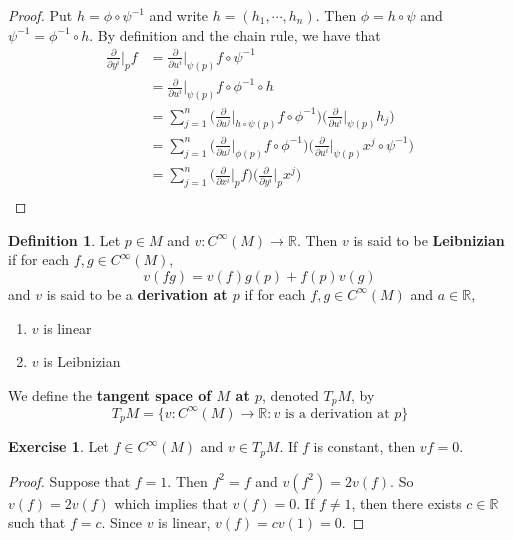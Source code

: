 \documentclass{book}
\theoremstyle{definition}
\newtheorem{defn}[definition]{Definition}
\newtheorem{ex}[definition]{Exercise}
\newcommand{\R}{\mathbb{R}}
\DeclareMathOperator*{\0}{\mbf{0}}
\DeclareMathOperator*{\1}{\mbf{1}}
\newcommand{\tbf}[1]{\textbf{#1}}
\newcommand{\p}{\partial}
\begin{document}
	\begin{proof}
		Put $h = \phi \circ \psi^{-1}$ and write $h = (h_1, \cdots, h_n)$. Then $\phi = h \circ \psi$ and $\psi^{-1} = \phi^{-1} \circ h$. By definition and the chain rule, we have that 
		\begin{align*}
		\frac{\p}{\p y^i} \bigg|_p f 
			&= \frac{\p}{\p u^i} \bigg|_{\psi(p)} f \circ \psi^{-1} \\
			&= \frac{\p}{\p u^i} \bigg|_{\psi(p)} f \circ \phi^{-1} \circ h \\
			&= \sum_{j=1}^n \bigg(\frac{\p}{\p u^j} \bigg|_{h \circ \psi (p)} f \circ \phi^{-1} \bigg)  \bigg( \frac{\p}{\p u^i} \bigg|_{\psi(p)} h_j \bigg) \\
			&= \sum_{j=1}^n \bigg(\frac{\p}{\p u^j} \bigg|_{\phi (p)} f \circ \phi^{-1}  \bigg) \bigg( \frac{\p}{\p u^i} \bigg|_{\psi(p)} x^j \circ \psi^{-1} \bigg) \\
			&= \sum_{j=1}^n \bigg( \frac{\p}{\p x^i} \bigg|_p f \bigg)  \bigg(   \frac{\p}{\p y^i} \bigg|_p x^j  \bigg)\\
		\end{align*}
	\end{proof}

	\begin{defn}
		Let $p \in M$ and $v: C^{\infty}(M) \rightarrow \R$. Then $v$ is said to be \tbf{Leibnizian} if for each $f,g \in  C^{\infty}(M)$, $$v(fg) = v(f)g(p) + f(p)v(g)$$ and $v$ is said to be a \tbf{derivation at $p$} if for each $f, g \in C^{\infty}(M)$ and $a \in \R$,
		\begin{enumerate}
			\item $v$ is linear 
			\item $v$ is Leibnizian
		\end{enumerate}
		We define the \tbf{tangent space of $M$ at $p$}, denoted $T_pM$, by $$T_pM = \{ v: C^{\infty}(M) \rightarrow \R: v \text{ is a derivation at }p\}$$
	\end{defn}

	\begin{ex}
		Let $f \in C^{\infty}(M)$ and $v \in T_pM$. If $f$ is constant, then $vf = 0$.
	\end{ex}

	\begin{proof}
		Suppose that $f = 1$. Then $f^2 = f$ and $v(f^2) = 2v(f)$. So $v(f) = 2v(f)$ which implies that $v(f) = 0$. If $f \neq 1$, then there exists $c \in \R$ such that $f = c$. Since $v$ is linear, $v(f) = cv(1) = 0$.
	\end{proof}
\end{document}

